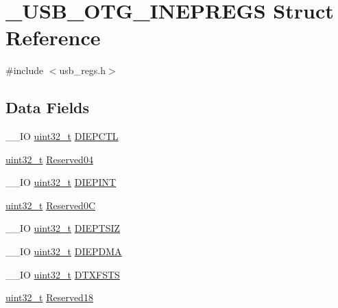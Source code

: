 \hypertarget{struct___u_s_b___o_t_g___i_n_e_p_r_e_g_s}{\section{\-\_\-\-U\-S\-B\-\_\-\-O\-T\-G\-\_\-\-I\-N\-E\-P\-R\-E\-G\-S Struct Reference}
\label{struct___u_s_b___o_t_g___i_n_e_p_r_e_g_s}
}


{\ttfamily \#include $<$usb\-\_\-regs.\-h$>$}

\subsection*{Data Fields}
\begin{DoxyCompactItemize}
\item 
\-\_\-\-\_\-\-I\-O \hyperlink{stdint_8h_a435d1572bf3f880d55459d9805097f62}{uint32\-\_\-t} \hyperlink{group___u_s_b___o_t_g___d_r_i_v_e_r_ga6891238f7ceac1ab150c9a7ae59219df}{D\-I\-E\-P\-C\-T\-L}
\item 
\hyperlink{stdint_8h_a435d1572bf3f880d55459d9805097f62}{uint32\-\_\-t} \hyperlink{group___u_s_b___o_t_g___d_r_i_v_e_r_ga279df0532f0eacc582a40057e66be6f6}{Reserved04}
\item 
\-\_\-\-\_\-\-I\-O \hyperlink{stdint_8h_a435d1572bf3f880d55459d9805097f62}{uint32\-\_\-t} \hyperlink{group___u_s_b___o_t_g___d_r_i_v_e_r_ga8dc7ac6e8918bb44f5733777eddcc6dc}{D\-I\-E\-P\-I\-N\-T}
\item 
\hyperlink{stdint_8h_a435d1572bf3f880d55459d9805097f62}{uint32\-\_\-t} \hyperlink{group___u_s_b___o_t_g___d_r_i_v_e_r_gaf8e2de19087dd5857ee7b735513f65d8}{Reserved0\-C}
\item 
\-\_\-\-\_\-\-I\-O \hyperlink{stdint_8h_a435d1572bf3f880d55459d9805097f62}{uint32\-\_\-t} \hyperlink{group___u_s_b___o_t_g___d_r_i_v_e_r_ga790a66756ca5fa1a3f5127ba50a8bc0a}{D\-I\-E\-P\-T\-S\-I\-Z}
\item 
\-\_\-\-\_\-\-I\-O \hyperlink{stdint_8h_a435d1572bf3f880d55459d9805097f62}{uint32\-\_\-t} \hyperlink{group___u_s_b___o_t_g___d_r_i_v_e_r_gafdee8155f2a0a978227fbe4c7dc3d150}{D\-I\-E\-P\-D\-M\-A}
\item 
\-\_\-\-\_\-\-I\-O \hyperlink{stdint_8h_a435d1572bf3f880d55459d9805097f62}{uint32\-\_\-t} \hyperlink{group___u_s_b___o_t_g___d_r_i_v_e_r_ga3202292a0e13e390381086f93ad3e8b9}{D\-T\-X\-F\-S\-T\-S}
\item 
\hyperlink{stdint_8h_a435d1572bf3f880d55459d9805097f62}{uint32\-\_\-t} \hyperlink{group___u_s_b___o_t_g___d_r_i_v_e_r_ga656e65007c1967f02d8000c79d70f739}{Reserved18}
\end{DoxyCompactItemize}


